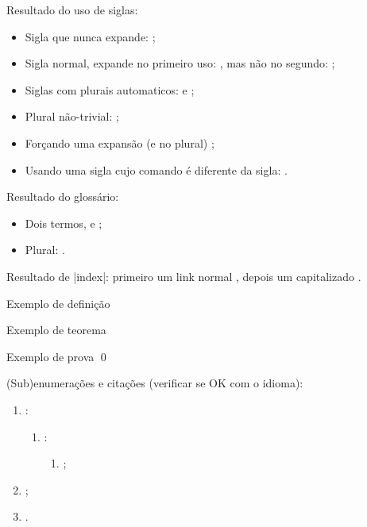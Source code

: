 Resultado do uso de siglas:
\begin{itemize}
\item Sigla que nunca expande: \API;
\item Sigla normal, expande no primeiro uso: \DHT, mas não no segundo: \DHT;
\item Siglas com plurais automaticos: \APIs e \DHTs;
\item Plural não-trivial: \SQs;
\item Forçando uma expansão (e no plural) ;
\item Usando uma sigla cujo comando é diferente da sigla: \WTC.
\end{itemize}

Resultado do glossário:
\begin{itemize}
\item Dois termos, \polling e \proxy;
\item Plural: \proxys.
\end{itemize}

Resultado de \mla|index|: primeiro um link normal , depois um capitalizado .

\begin{defn}
  Exemplo de definição
\end{defn}

\begin{theorem}
  Exemplo de teorema
\end{theorem}

\begin{theoremproof}
  Exemplo de prova \qed
\end{theoremproof}

(Sub)enumerações e citações (verificar se OK com o idioma):
\begin{enumerate}
\item \cite{turing1937}:
  \begin{enumerate}
  \item {}:
    \begin{enumerate}
    \item {};
    \end{enumerate}
  \end{enumerate}
\item \cite{turing1937,dijkstra1968};
\item {}.
\end{enumerate}


